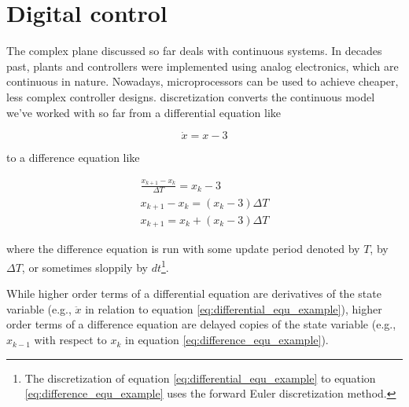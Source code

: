 
\chapter{Digital control} \label{ch:digital_control}

The complex plane discussed so far deals with continuous \glspl{system}. In
decades past, \glspl{plant} and controllers were implemented using analog
electronics, which are continuous in nature. Nowadays, microprocessors can be
used to achieve cheaper, less complex controller designs. \Gls{discretization}
converts the continuous \gls{model} we've worked with so far from a differential
equation like

\begin{equation}
  \dot{x} = x - 3 \label{eq:differential_equ_example}
\end{equation}

to a difference equation like

\begin{align}
  \frac{x_{k+1} - x_k}{\Delta T} = x_k - 3 \nonumber \\
  x_{k+1} - x_k = (x_k - 3) \Delta T \nonumber \\
  x_{k+1} = x_k + (x_k - 3) \Delta T \label{eq:difference_equ_example}
\end{align}

where the difference equation is run with some update period denoted by $T$, by
$\Delta T$, or sometimes sloppily by $dt$\footnote{The discretization of
equation \eqref{eq:differential_equ_example} to equation
\eqref{eq:difference_equ_example} uses the forward Euler discretization
method.}.

While higher order terms of a differential equation are derivatives of the
\gls{state} variable (e.g., $\ddot{x}$ in relation to equation
\eqref{eq:differential_equ_example}), higher order terms of a difference
equation are delayed copies of the \gls{state} variable (e.g., $x_{k-1}$ with
respect to $x_k$ in equation \eqref{eq:difference_equ_example}).

\renewcommand*{\chapterpath}{\partpath/digital-control}







